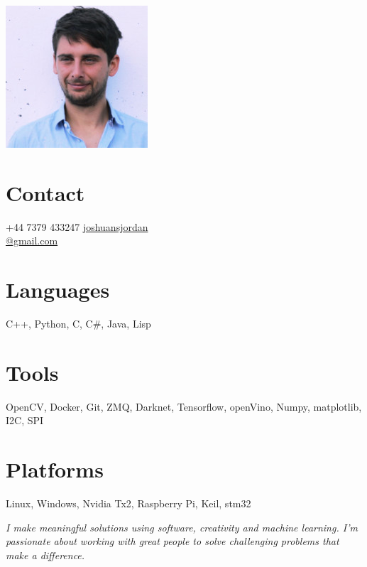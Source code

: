 \documentclass[print]{friggeri-cv} %
\begin{document}

\begin{aside} %
\includegraphics[width=0.6\columnwidth]{0.jpg} %
\section{Contact}
+44 7379 433247
\href{mailto:joshuansjordan@gmail.com}{joshuansjordan\\@gmail.com}
\section{Languages}
C++, Python, C, C\#, Java, Lisp
\section{Tools}
OpenCV, Docker, Git, ZMQ, Darknet, Tensorflow, openVino, Numpy, matplotlib, I2C, SPI
\section{Platforms}
Linux, Windows, Nvidia Tx2, Raspberry Pi, Keil, stm32
\end{aside}

\emph{I make meaningful solutions using software, creativity and machine learning. I'm passionate about working with great people to solve challenging problems that make a difference.}
\end{document}
